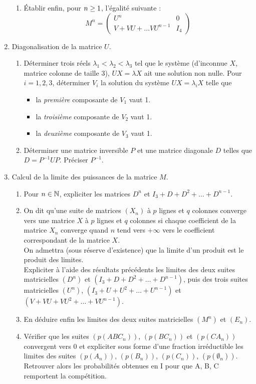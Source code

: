\begin{enumerate}
\begin{enumerate}
\item  Établir enfin, pour $n \geq 1$, l'égalité suivante :
$$M^n=\left(\begin{array}{cc}
U^n & 0\\ V+VU+\dots VU^{n-1} & I_4
\end{array}\right)$$
\end{enumerate}

\item  Diagonalisation de la matrice $U$.
\begin{enumerate}
\item Déterminer trois réels $\lambda_1<\lambda_2< \lambda_3$ tel que le système  (d'inconnue  $X$, matrice colonne de taille 3),  $UX=\lambda X$ ait une solution non nulle.
Pour $i=1,2,3$, déterminer $V_i$ la solution du système  $UX=\lambda_iX$ telle que 
\begin{itemize}
\item la \textit{première} composante de $V_1$ vaut 1.
\item la \textit{troisième} composante de $V_2$ vaut 1.
\item la \textit{deuxième} composante de $V_3$ vaut 1.
\end{itemize}  
\item Déterminer une matrice inversible $P$ et une matrice diagonale $D$  telles que $D=P^{-1}UP$. Préciser $P^{-1}$. 
\end{enumerate}

\item  Calcul de la limite des puissances de la matrice $M$.
\begin{enumerate}
\item Pour $n\in\mathbb{N}$, expliciter les matrices $D^n$ et $I_3 + D + D^2 + \dots + D^{n-1}$.
\item On dit qu'une suite de matrices $(X_n)$ à $p$ lignes et $q$ colonnes converge vers une matrice $X$ à
$p$ lignes et $q$ colonnes si chaque coefficient de la matrice $X_n$ converge quand $n$ tend vers $+\infty$ vers le coefficient correspondant de la matrice $X$.\\
On admettra (sous réserve d'existence) que la limite d'un produit est le produit des limites.\\
Expliciter à l'aide des résultats précédents les limites des deux suites matricielles $(D^n)$ et
$(I_3 + D + D^2 + \dots + D^{n-1})$, puis des trois suites matricielles $(U^n)$, $(I_3 + U + U^2 + \dots + U^{n-1})$
et $(V + VU + VU^2 + \dots + VU^{n-1})$.
\item En déduire enfin les limites des deux suites matricielles $(M^n)$ et $(E_n)$.
\item Vérifier que les suites $(p(ABC_n))$, $(p(BC_n))$ et $(p(CA_n))$ convergent vers $0$ et expliciter sous
forme d'une fraction irréductible les limites des suites $(p(A_n))$, $(p(B_n))$, $(p(C_n))$, $(p(\emptyset_n))$.\\
Retrouver alors les probabilités obtenues en I pour que A, B, C remportent la compétition.
\end{enumerate}
\end{enumerate} 
